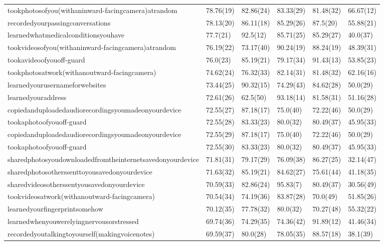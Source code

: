 \documentclass[a4paper,12pt]{article}
\begin{document}
\begin{longtable}{| p{7cm} | l | l | l | l | l |}
tookphotosofyou(withaninward-facingcamera)atrandom & 78.76(19) & 82.86(24) & 83.33(29) & 81.48(32) & 66.67(12) \\ 
recordedyourpassingconversations & 78.13(20) & 86.11(18) & 85.29(26) & 87.5(20) & 55.88(21) \\ 
learnedwhatmedicalconditionsyouhave & 77.7(21) & 92.5(12) & 85.71(25) & 85.29(27) & 40.0(37) \\ 
tookvideosofyou(withaninward-facingcamera)atrandom & 76.19(22) & 73.17(40) & 90.24(19) & 88.24(19) & 48.39(31) \\ 
tookavideoofyouoff-guard & 76.0(23) & 85.19(21) & 79.17(34) & 91.43(13) & 53.85(23) \\ 
tookphotosatwork(withanoutward-facingcamera) & 74.62(24) & 76.32(33) & 82.14(31) & 81.48(32) & 62.16(16) \\ 
learnedyourusernameforwebsites & 73.44(25) & 90.32(15) & 74.29(43) & 84.62(28) & 50.0(29) \\ 
learnedyouraddress & 72.61(26) & 62.5(50) & 93.18(14) & 81.58(31) & 51.16(28) \\ 
copiedanduploadedaudiorecordingsyoumadeonyourdevice & 72.55(27) & 87.18(17) & 75.0(40) & 72.22(46) & 50.0(29) \\ 
tookaphotoofyouoff-guard & 72.55(28) & 83.33(23) & 80.0(32) & 80.49(37) & 45.95(33) \\ 
copiedanduploadedaudiorecordingsyoumadeonyourdevice & 72.55(29) & 87.18(17) & 75.0(40) & 72.22(46) & 50.0(29) \\ 
tookaphotoofyouoff-guard & 72.55(30) & 83.33(23) & 80.0(32) & 80.49(37) & 45.95(33) \\ 
sharedphotosyoudownloadedfromtheinternetsavedonyourdevice & 71.81(31) & 79.17(29) & 76.09(38) & 86.27(25) & 32.14(47) \\ 
sharedphotosotherssenttoyousavedonyourdevice & 71.63(32) & 85.19(21) & 84.62(27) & 75.61(44) & 41.18(35) \\ 
sharedvideosotherssentyousavedonyourdevice & 70.59(33) & 82.86(24) & 95.83(7) & 80.49(37) & 30.56(49) \\ 
tookvideosatwork(withanoutward-facingcamera) & 70.54(34) & 74.19(36) & 83.87(28) & 70.0(49) & 51.85(26) \\ 
learnedyourfingerprintsomehow & 70.12(35) & 77.78(32) & 80.0(32) & 70.27(48) & 55.32(22) \\ 
learnedwhenyouwerelyingnervousorstressed & 69.74(36) & 74.29(35) & 74.36(42) & 91.89(12) & 41.46(34) \\ 
recordedyoutalkingtoyourself(makingvoicenotes) & 69.59(37) & 80.0(28) & 78.05(35) & 88.57(18) & 38.1(39) \\ 

\end{longtable}
\end{document}
